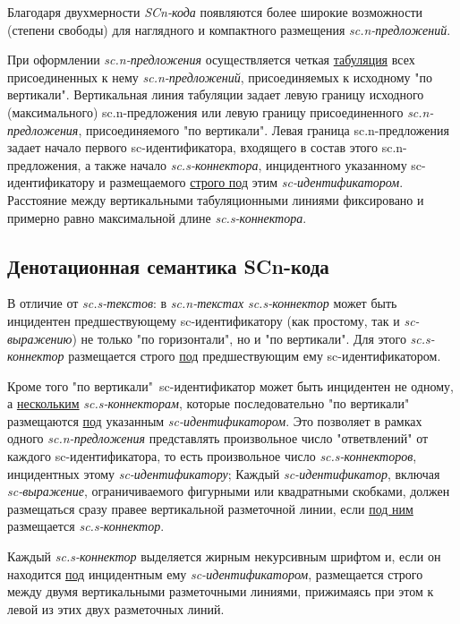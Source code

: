 Благодаря двухмерности \textit{SCn-кода} появляются более широкие возможности (степени свободы) для наглядного и компактного размещения \textit{sc.n-предложений}.

При оформлении \textit{sc.n-предложения} осуществляется четкая \uline{табуляция} всех присоединенных к нему \textit{sc.n-предложений}, присоединяемых к исходному "по вертикали"{}. Вертикальная линия табуляции задает левую границу исходного (максимального) sc.n-предложения или левую границу присоединенного \textit{sc.n-предложения}, присоединяемого "по вертикали". Левая граница sc.n-предложения задает начало первого sc-идентификатора, входящего в состав этого \mbox{sc.n-предложения}, а также начало \textit{sc.s-коннектора}, инцидентного указанному \mbox{sc-идентификатору} и размещаемого \uline{строго под} этим \textit{sc-идентификатором}. Расстояние между вертикальными табуляционными линиями фиксировано и примерно равно максимальной длине \textit{sc.s-коннектора}.

\subsection{Денотационная семантика SCn-кода}
\label{sec_scn_semantics}

В отличие от \textit{sc.s-текстов}: в \textit{sc.n-текстах} \textit{sc.s-коннектор} может быть инцидентен предшествующему sc-идентификатору (как простому, так и \textit{sc-выражению}) не только "по горизонтали"{}, но и "по вертикали"{}. Для этого \textit{sc.s-коннектор} размещается строго \uline{под} предшествующим ему sc-идентификатором.

Кроме того "по вертикали"\ sc-идентификатор может быть инцидентен не одному, а \uline{нескольким} \textit{sc.s-коннекторам}, которые последовательно "по вертикали"{} размещаются \uline{под} указанным \textit{sc-идентификатором}. Это позволяет в рамках одного \textit{sc.n-предложения} представлять произвольное число "ответвлений"{} от каждого sc-идентификатора, то есть произвольное число \textit{sc.s-коннекторов}, инцидентных этому \textit{sc-идентификатору};
Каждый \textit{sc-идентификатор}, включая \textit{sc-выражение}, ограничиваемого фигурными или квадратными скобками, должен размещаться сразу правее вертикальной разметочной линии, если \uline{под ним} размещается \textit{sc.s-коннектор}.

Каждый \textit{sc.s-коннектор} выделяется жирным некурсивным шрифтом и, если он находится \uline{под} инцидентным ему \textit{sc-идентификатором}, размещается строго между двумя вертикальными разметочными линиями, прижимаясь при этом к левой из этих двух разметочных линий.

